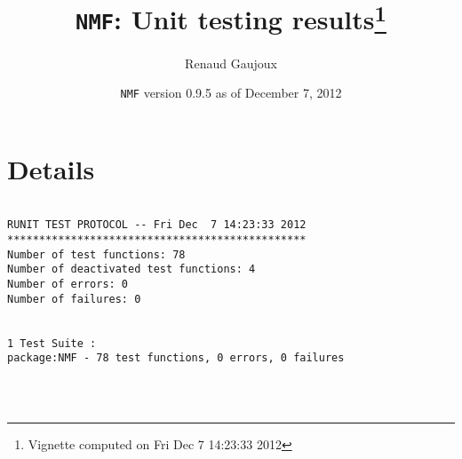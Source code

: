 \documentclass[10pt]{article}
\author{Renaud Gaujoux}
\title{\texttt{NMF}: Unit testing results\footnote{Vignette computed  on Fri Dec  7 14:23:33 2012}}
\date{\texttt{NMF} version 0.9.5 as of December  7, 2012}
\begin{document}
\maketitle

\section{Details}
\begin{verbatim}

RUNIT TEST PROTOCOL -- Fri Dec  7 14:23:33 2012 
*********************************************** 
Number of test functions: 78 
Number of deactivated test functions: 4 
Number of errors: 0 
Number of failures: 0 

 
1 Test Suite : 
package:NMF - 78 test functions, 0 errors, 0 failures




\end{verbatim}
\end{document}
